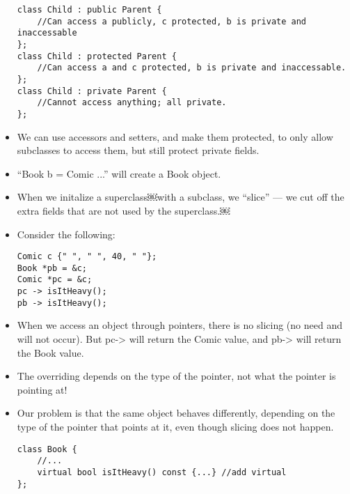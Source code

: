 \documentclass{article}
\begin{document}
\begin{itemize}
\begin{lstlisting}
class Child : public Parent {
    //Can access a publicly, c protected, b is private and inaccessable
};
class Child : protected Parent {
    //Can access a and c protected, b is private and inaccessable.
};
class Child : private Parent {
    //Cannot access anything; all private.
};
\end{lstlisting}
\item We can use accessors and setters, and make them protected, to only allow subclasses to access them, but still protect private fields.
\item ``Book b = Comic {...}'' will create a Book object.
\item When we initalize a superclass￼with a subclass, we ``slice'' --- we cut off the extra fields that are not used by the superclass.￼ 
\item Consider the following:
\begin{lstlisting}
Comic c {" ", " ", 40, " "};
Book *pb = &c;
Comic *pc = &c;
pc -> isItHeavy(); 
pb -> isItHeavy();
\end{lstlisting}
\item When we access an object through pointers, there is no slicing (no need and will not occur).  But pc-> will return the Comic value, and pb-> will return the Book value.
\item The overriding depends on the type of the pointer, not what the pointer is pointing at!
\item Our problem is that the same object behaves differently, depending on the type of the pointer that points at it, even though slicing does not happen.
\begin{lstlisting}
class Book {
    //...
    virtual bool isItHeavy() const {...} //add virtual
};


\end{lstlisting}
\end{itemize}
\end{document}
